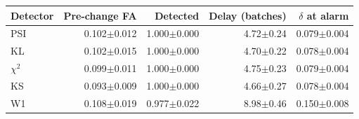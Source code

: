\begin{tabular}{lrrrr}
\toprule
Detector & Pre-change FA & Detected & Delay (batches) & $\delta$ at alarm \\
\midrule
PSI & 0.102$\pm$0.012 & 1.000$\pm$0.000 & 4.72$\pm$0.24 & 0.079$\pm$0.004 \\
KL & 0.102$\pm$0.015 & 1.000$\pm$0.000 & 4.70$\pm$0.22 & 0.078$\pm$0.004 \\
$\chi^2$ & 0.099$\pm$0.011 & 1.000$\pm$0.000 & 4.75$\pm$0.23 & 0.079$\pm$0.004 \\
KS & 0.093$\pm$0.009 & 1.000$\pm$0.000 & 4.66$\pm$0.27 & 0.078$\pm$0.004 \\
W1 & 0.108$\pm$0.019 & 0.977$\pm$0.022 & 8.98$\pm$0.46 & 0.150$\pm$0.008 \\
\bottomrule
\end{tabular}